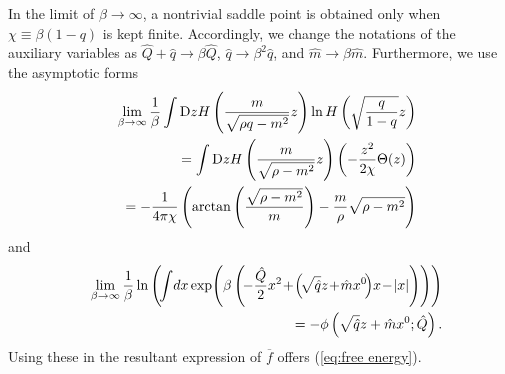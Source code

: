 \documentclass[12pt]{iopart}
\begin{document}
In the limit of $\beta \to \infty$, a nontrivial saddle point is obtained only when $\chi \equiv \beta (1-q)$ is kept finite. Accordingly, we change the notations of the auxiliary variables as $\hat{Q}+\hat{q} \to \beta \hat{Q}$, $\hat{q} \to \beta^2 \hat{q}$, and $\hat{m} \to \beta \hat{m}$. Furthermore, we use the asymptotic forms
\begin{eqnarray}
&&\lim_{\beta \to \infty}\frac{1}{\beta}\int {\rm D}z
H\left (\frac{m}{\sqrt{\rho q-m^2} }z \right )
\ln H\left (\sqrt{\frac{q}{1-q}} z \right ) \cr
&&=\int {\rm D}z
H\left (\frac{m}{\sqrt{\rho -m^2} }z \right )\left (-\frac{z^2}{2\chi} \Theta(z) \right ) \cr
&&= -\frac{1}{4 \pi \chi}\left (\arctan \left (\frac{\sqrt{\rho-m^2}}{m} \right )
-\frac{m}{\rho}\sqrt{\rho-m^2} \right ) 
\end{eqnarray}
and 
\begin{eqnarray}
&&\lim_{\beta \to \infty}\frac{1}{\beta}
\ln 
\left (
\!
\int 
\!
dx \exp 
\!\left (\beta \left (
\!
-\frac{\hat{Q}}{2} x^2\!+\!\left (\!\sqrt{\hat{q}}z \!+\! \hat{m} x^0 \!\right )
\!x \!-\! |x| \right ) \right )
\right ) \cr
&& =-\phi\left (\sqrt{\hat{q}}z+\hat{m}x^0;\hat{Q} \right ). 
\end{eqnarray}
Using these in the resultant expression of $\overline{f}$ offers (\ref{eq:free energy}). 
\end{document}

